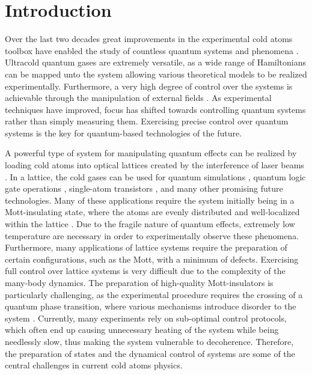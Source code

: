 \chapter{Introduction}
Over the last two decades great improvements in the experimental cold atoms toolbox have enabled the study of countless quantum systems and phenomena \cite{manybodyBloch,Bloch2012}. Ultracold quantum gases are extremely versatile, as a wide range of Hamiltonians can be mapped unto the system allowing various theoretical models to be realized experimentally. Furthermore, a very high degree of control over the systems is achievable through the manipulation of external fields \cite{JakschZoller}.
As experimental techniques have improved, focus has shifted towards controlling quantum systems rather than simply measuring them. Exercising precise control over quantum systems is the key for quantum-based technologies of the future.

A powerful type of system for manipulating quantum effects can be realized by loading cold atoms into optical lattices created by the interference of laser beams \cite{grimm}. In a lattice, the cold gases can be used for quantum simulations \cite{Jane2003,Jaksch2003}, quantum logic gate operations \cite{Zoller1999,Mandel2003,Jaksch2000}, single-atom transistors \cite{Micheli2004}, and many other promising future technologies. Many of these applications require the system initially being in a Mott-insulating state, where the atoms are evenly distributed and well-localized within the lattice \cite{lewenstein}.
Due to the fragile nature of quantum effects, extremely low temperature are necessary in order to experimentally observe these phenomena. Furthermore, many applications of lattice systems require the preparation of certain configurations, such as the Mott, with a minimum of defects. Exercising full control over lattice systems is very difficult due to the complexity of the many-body dynamics. The preparation of high-quality Mott-insulators is particularly challenging, as the experimental procedure requires the crossing of a quantum phase transition, where various mechanisms introduce disorder to the system \cite{Zurek2005,Braun2015}. Currently, many experiments rely on sub-optimal control protocols, which often end up causing unnecessary heating of the system while being needlessly slow, thus making the system vulnerable to decoherence.
Therefore, the preparation of states and the dynamical control of systems are some of the central challenges in current cold atoms physics.

